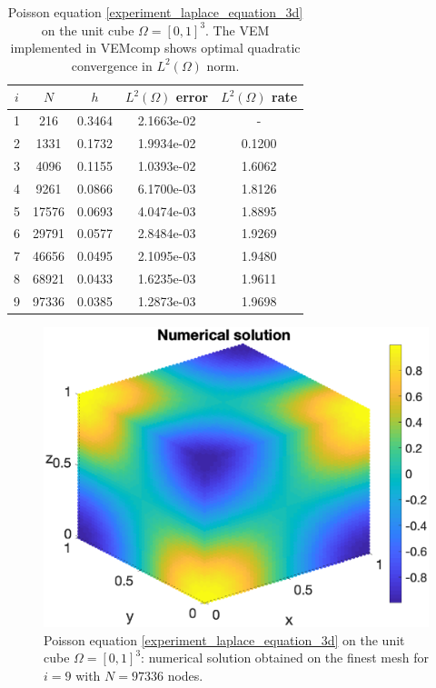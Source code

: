 \documentclass[a4paper]{article}
\begin{document}
\begin{table}[H]
\caption{Poisson equation \eqref{experiment_laplace_equation_3d} on the unit cube $\Omega = [0,1]^3$. The VEM implemented in VEMcomp shows optimal quadratic convergence in $L^2(\Omega)$ norm.}
\begin{center}
\begin{tabular}{c | c | c | c | c}
$i$ & $N$ & $h$ & $L^2(\Omega)$ error & $L^2(\Omega)$ rate\\
\hline
1 & 216 & 0.3464 &   2.1663e-02 &     -\\
2 & 1331 & 0.1732 & 1.9934e-02 & 0.1200    \\
3 & 4096 & 0.1155 & 1.0393e-02 & 1.6062    \\
4 & 9261 & 0.0866 &  6.1700e-03 & 1.8126    \\
5 &  17576 &  0.0693 & 4.0474e-03 & 1.8895    \\
6 & 29791  & 0.0577 & 2.8484e-03 & 1.9269    \\
7 &  46656 & 0.0495 & 2.1095e-03 & 1.9480    \\
8 & 68921 & 0.0433 & 1.6235e-03  & 1.9611   \\
9 & 97336 & 0.0385 &  1.2873e-03 &  1.9698
\end{tabular}
\end{center}
\label{tab:laplace_3d_convergence}
\end{table}

\begin{figure}[H]
\begin{center}
\includegraphics[scale=0.5]{laplace3dcube_numsol_Nx46.eps}
\end{center}
\caption{Poisson equation \eqref{experiment_laplace_equation_3d} on the unit cube $\Omega = [0,1]^3$: numerical solution obtained on the finest mesh for $i=9$ with $N= 97336$ nodes.}
\label{fig:laplace_3d_numsol}
\end{figure}
\end{document}

